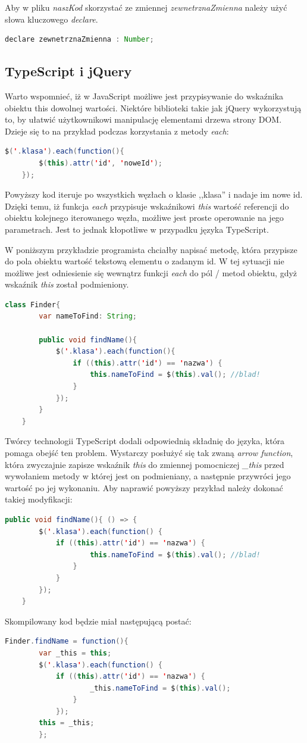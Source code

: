 Aby w pliku \textit{naszKod} skorzystać ze zmiennej \textit{zewnetrznaZmienna} należy użyć słowa kluczowego \textit{declare}.
\begin{lstlisting}[language=Java]
	declare zewnetrznaZmienna : Number;
\end{lstlisting}

\subsection{TypeScript i jQuery}
Warto wspomnieć, iż w JavaScript możliwe jest przypisywanie do wskaźnika obiektu this dowolnej wartości. Niektóre biblioteki takie jak jQuery wykorzystują to, by ułatwić użytkownikowi manipulację elementami drzewa strony DOM. Dzieje się to na przykład podczas korzystania z metody \textit{each}:

\begin{lstlisting}[language=Java]
	$('.klasa').each(function(){
		$(this).attr('id', 'noweId');
	});
\end{lstlisting}
Powyższy kod iteruje po wszystkich węzłach o klasie ,,klasa'' i nadaje im nowe id. Dzięki temu, iż funkcja \textit{each} przypisuje wskaźnikowi \textit{this} wartość referencji do obiektu kolejnego iterowanego węzła, możliwe jest proste operowanie na jego parametrach. Jest to jednak kłopotliwe w przypadku języka TypeScript.

W poniższym przykładzie programista chciałby napisać metodę, która przypisze do pola obiektu wartość tekstową elementu o zadanym id. W tej sytuacji nie możliwe jest odniesienie się wewnątrz funkcji \textit{each} do pól / metod obiektu, gdyż wskaźnik \textit{this} został podmieniony.
\begin{lstlisting}[language=Java]
	class Finder{
		var nameToFind: String;
	
		public void findName(){
			$('.klasa').each(function(){
				if ((this).attr('id') == 'nazwa') {
					this.nameToFind = $(this).val(); //blad!
				}
			});
		}
	}
\end{lstlisting}

Twórcy technologii TypeScript dodali odpowiednią składnię do języka, która pomaga obejść ten problem. Wystarczy posłużyć się tak zwaną \textit{arrow function}, która zwyczajnie zapisze wskaźnik \textit{this} do zmiennej pomocniczej \textit{\_this} przed wywołaniem metody w której jest on podmieniany, a następnie przywróci jego wartość po jej wykonaniu. Aby naprawić powyższy przykład należy dokonać takiej modyfikacji:

\begin{lstlisting}[language=Java]
	public void findName(){ () => {
		$('.klasa').each(function() {
			if ((this).attr('id') == 'nazwa') { 
					this.nameToFind = $(this).val(); //blad!
				}
			}
		});
	}
\end{lstlisting}

Skompilowany kod będzie miał następującą postać:
\begin{lstlisting}[language=Java]
	Finder.findName = function(){ 
		var _this = this;
		$('.klasa').each(function() {
			if ((this).attr('id') == 'nazwa') { 
					_this.nameToFind = $(this).val();
				}
			});
		this = _this;
		};
\end{lstlisting}

